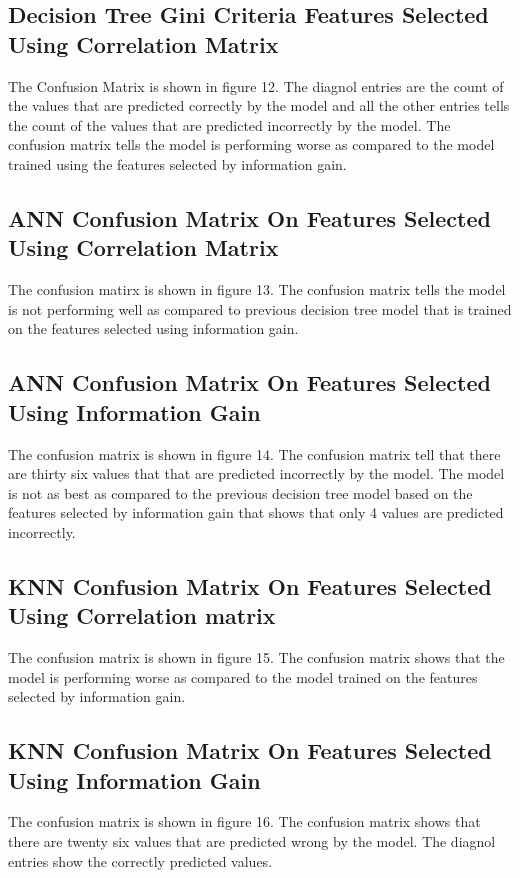 \documentclass{article}
\begin{document}
\subsection{Decision Tree Gini Criteria Features Selected Using Correlation Matrix}
The Confusion Matrix is shown in figure 12. The diagnol entries are the count of the values that are predicted correctly by the model and all the other entries tells the count of the values that are predicted incorrectly by the model. The confusion matrix tells the model is performing worse as compared to the model trained using the features selected by information gain.


\subsection{ANN Confusion Matrix On Features Selected Using Correlation Matrix}
The confusion matirx is shown in figure 13. The confusion matrix tells the model is not performing well as compared to previous decision tree model that is trained on the features selected using information gain.


\subsection{ANN Confusion Matrix On Features Selected Using Information Gain}
The confusion matrix is shown in figure 14. The confusion matrix tell that there are thirty six values that that are predicted incorrectly by the model. The model is not as best as compared to the previous decision tree model based on the features selected by information gain that shows that only 4 values are predicted incorrectly.

\subsection{KNN Confusion Matrix On Features Selected Using Correlation matrix}
The confusion matrix is shown in figure 15. The confusion matrix shows that the model is performing worse as compared to the model trained on the features selected by information gain.

\subsection{KNN Confusion Matrix On Features Selected Using Information Gain}
The confusion matrix is shown in figure 16. The confusion matrix shows that there are twenty six values that are predicted wrong by the model. The diagnol entries show the correctly predicted values.
 
\end{document}
